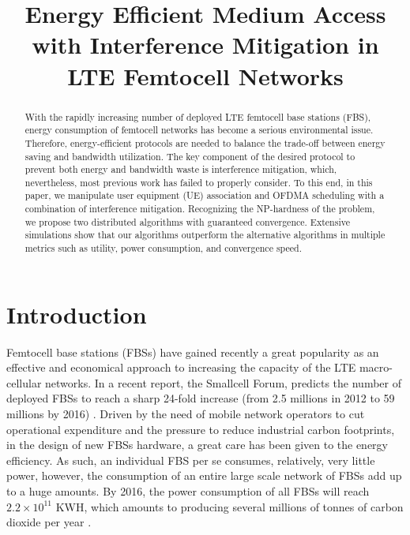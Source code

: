 \documentclass[conference]{IEEEtran}
\begin{document}
\title{Energy Efficient Medium Access with Interference Mitigation in LTE Femtocell Networks}


\author{
 }


\maketitle


\begin{abstract}

With the rapidly increasing number of deployed LTE femtocell base stations (FBS), energy consumption of femtocell networks has become a serious environmental issue. Therefore, energy-efficient protocols are needed to balance the trade-off between energy saving and bandwidth utilization. The key component of the desired protocol to prevent both energy and bandwidth waste is interference mitigation, which, nevertheless, most previous work has failed to properly consider. To this end, in this paper, we manipulate user equipment (UE) association and OFDMA scheduling with a combination of interference mitigation. Recognizing the NP-hardness of the problem, we propose two distributed algorithms with guaranteed convergence. Extensive simulations show that our algorithms outperform the alternative algorithms in multiple metrics such as utility, power consumption, and convergence speed.
\end{abstract}



\IEEEpeerreviewmaketitle


\section{Introduction}


Femtocell base stations (FBSs) have gained recently a great popularity as an effective and economical approach to increasing the capacity of the LTE macro-cellular networks. In a recent report, the Smallcell Forum, predicts the number of deployed FBSs to reach a sharp 24-fold increase (from 2.5 millions in 2012 to 59 millions by 2016) \cite{Informa2013}. Driven by the need of mobile network operators to cut operational expenditure and the pressure to reduce industrial carbon footprints, in the design of new FBSs hardware, a great care has been given to the energy efficiency. As such, an individual FBS per se consumes, relatively, very little power, however, the consumption of an entire large scale network of FBSs add up to a  huge amounts. By 2016, the power consumption of all FBSs will reach $2.2\times 10^{11}$ KWH, which amounts to producing several millions of tonnes of carbon dioxide per year \cite{Informa2013}.
\end{document}
